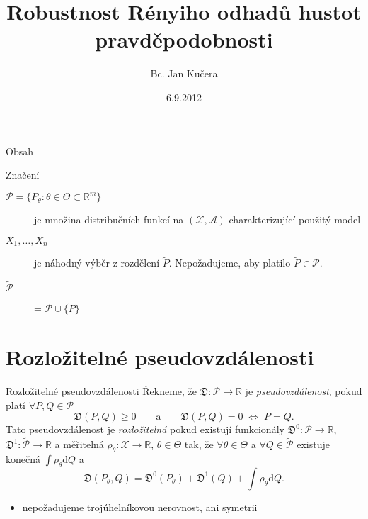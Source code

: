 \documentclass[11pt,a4paper]{beamer}
\author{Bc. Jan Kučera}
\title{Robustnost Rényiho odhadů hustot pravděpodobnosti}
\institute{FJFI, ČVUT\\ $\quad$  \\ Vedoucí práce: Ing. Václav Kůs Ph.D.}
\date{6.9.2012}
\begin{document}
\begin{frame}
	\maketitle
\end{frame}

\begin{frame}{Obsah}
    	\tableofcontents
\end{frame}

%
\begin{frame}{Značení}
\begin{description}
	\item[$\mathcal{P} = \lbrace P_\theta : \theta \in \Theta \subset \mathbb{R}^m \rbrace$] je množina distribučních funkcí na  $\left(\mathcal{X},\mathcal{A}\right)$ charakterizující použitý model
	\item[$X_1,\ldots,X_n$] je náhodný výběr z rozdělení $\tilde{P}$. Nepožadujeme, aby platilo $\tilde{P} \in \mathcal{P}$.
	\item[$\mathcal{\tilde{P}}$] = $\mathcal{P} \cup \lbrace \tilde{P} \rbrace$
\end{description}
\end{frame}

\section{Rozložitelné pseudovzdálenosti} %
\begin{frame}{Rozložitelné pseudovzdálenosti}
		Řekneme, že $\mathfrak{D}:\mathcal{P} \rightarrow \mathbb{R}$ je \emph{pseudovzdálenost}, pokud platí $\forall P,Q\in\mathcal{P}$
		\begin{equation*}
			\mathfrak{D}(P,Q) \geq 0  \qquad \text{a} \qquad \mathfrak{D}(P,Q)=0 \; \Leftrightarrow \; P=Q.
		\end{equation*}
		 Tato  pseudovzdálenost je  \emph{rozložitelná} pokud existují funkcionály
		 $\mathfrak{D}^0:\mathcal{P}\rightarrow\mathbb{R}$, $ \mathfrak{D}^1:\mathcal{\tilde{P}} \rightarrow \mathbb{R}$ a měřitelná
		  $\rho_\theta : \mathcal{X} \rightarrow \mathbb{R}$, $ \theta \in \Theta$ tak, že $\forall \theta \in \Theta$ a $\forall Q \in \mathcal{\tilde{P}}$ existuje konečná $\int{\rho_\theta }\mathrm{d}Q$ a
		\begin{equation*}
			\mathfrak{D} (P_\theta, Q) = \mathfrak{D}^0 (P_\theta) + \mathfrak{D}^1 (Q) + \int \rho_\theta \mathrm{d}Q.
		\end{equation*}
		\begin{itemize}
			\item nepožadujeme trojúhelníkovou nerovnost, ani symetrii
		\end{itemize}			
\end{frame}
\end{document}
